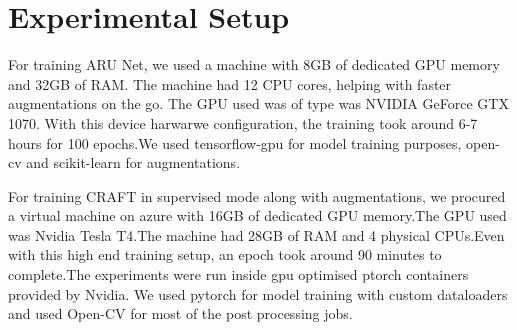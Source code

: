 %


{\let\clearpage\relax \chapter{Experimental Setup}}

For training ARU Net, we used a machine with 8GB of dedicated GPU memory and 32GB of RAM. The machine had 12 CPU cores, helping with faster augmentations on the go. The GPU used was of type was NVIDIA GeForce GTX 1070. With this device harwarwe configuration, the training took around 6-7 hours for 100 epochs.We used tensorflow-gpu for model training purposes, open-cv and scikit-learn for augmentations.

For training CRAFT in supervised mode along with augmentations, we procured a virtual machine on azure with 16GB of dedicated GPU memory.The GPU used was Nvidia Tesla T4.The machine had 28GB of RAM and 4 physical CPUs.Even with this high end training setup, an epoch took around 90 minutes to complete.The experiments were run inside gpu optimised ptorch containers provided by Nvidia. We used pytorch for model training with custom dataloaders and used Open-CV for most of the post processing jobs.

